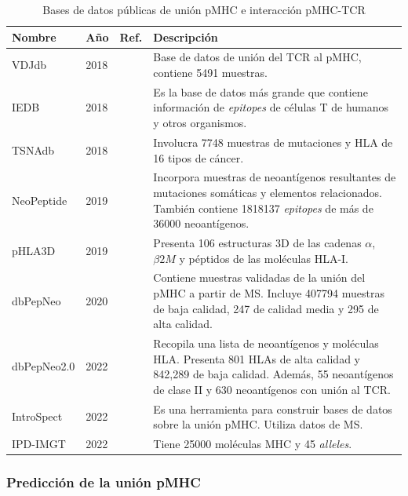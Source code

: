 \begin{table}[h]
	\caption{Bases de datos públicas de unión pMHC e interacción pMHC-TCR}
	\label{tab:bd}
	\setlength{\tabcolsep}{0.5em} %
	{\renewcommand{\arraystretch}{1.2}%
		
		\begin{tabular}{lp{1cm}p{3.5cm}p{6cm}}
			\textbf{Nombre} & \textbf{Año} & \textbf{Ref.} & \textbf{Descripción} \\ \hline
			VDJdb           & 2018 & \cite{shugay2018vdjdb, bagaev2020vdjdb} & Base de datos de unión del TCR al pMHC, contiene 5491 muestras. \\
			IEDB            & 2018 & \cite{vita2019immune} & Es la base de datos más grande que contiene información de \textit{epitopes} de células T de humanos y otros organismos. \\
			TSNAdb          & 2018 & \cite{wu2018tsnadb} & Involucra 7748 muestras de mutaciones y HLA de 16 tipos de cáncer. \\
			NeoPeptide      & 2019 & \cite{zhou2019neopeptide} & Incorpora muestras de neoantígenos resultantes de mutaciones somáticas y elementos relacionados. También contiene 1818137 \textit{epitopes} de más de 36000 neoantígenos. \\
			
			pHLA3D          & 2019 & \cite{e2019phla3d} & Presenta 106 estructuras 3D de las cadenas $\alpha$, $\beta 2M$ y péptidos de las moléculas HLA-I. \\
			dbPepNeo        & 2020 & \cite{tan2020dbpepneo} & Contiene muestras validadas de la unión del pMHC a partir de MS. Incluye 407794 muestras de baja calidad, 247 de calidad media y 295 de alta calidad. \\
			dbPepNeo2.0     & 2022 & \cite{lu2022dbpepneo2} & Recopila una lista de neoantígenos y moléculas HLA. Presenta 801 HLAs de alta calidad y 842,289 de baja calidad. Además, 55 neoantígenos de clase II y 630 neoantígenos con unión al TCR. \\
			IntroSpect      & 2022 & \cite{zhang2022introspect} & Es una herramienta para construir bases de datos sobre la unión pMHC. Utiliza datos de MS. \\
			IPD-IMGT    & 2022 & \cite{robinson2020ipd} & Tiene 25000 moléculas MHC y 45 \textit{alleles}. \\
		\end{tabular}
	}
\end{table}

\subsubsection{Predicción de la unión pMHC}


